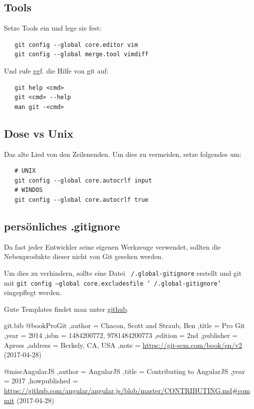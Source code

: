 \documentclass[
   draft=false
  ,paper=a4
  ,twoside=false
  ,fontsize=11pt
  ,headsepline
  ,DIV=11
  ,parskip=full+
  ,titlepage
]{scrartcl} %
\begin{document}
\subsection{Tools}

Setze Tools ein und lege sie fest:
\begin{lstlisting}
   git config --global core.editor vim
   git config --global merge.tool vimdiff   
\end{lstlisting}

Und rufe ggf. die Hilfe von git auf:
\begin{lstlisting}
   git help <cmd>
   git <cmd> --help
   man git -<cmd>
\end{lstlisting}


\subsection{Dose vs Unix}
Das alte Lied von den Zeilenenden. Um dies zu vermeiden, setze folgendes um:
\begin{lstlisting}
   # UNIX
   git config --global core.autocrlf input    
   # WINDOS
   git config --global core.autocrlf true
\end{lstlisting}

\subsection{persönliches .gitignore}
Da fast jeder Entwickler seine eigenen Werkzeuge verwendet, sollten die 
Nebenprodukte dieser nicht von Git gesehen werden.

Um dies zu verhindern, sollte eine Datei \texttt{~/.global-gitignore}
erstellt und git mit 
\newline 
\texttt{git config --global core.excludesfile '~/.global-gitignore'}
\newline
eingepflegt werden.

Gute Templates findet man unter 
\href{https://github.com/github/gitignore/tree/master/Global}{github}.

\begin{filecontents}{git.bib}
@book{ProGit
  ,author    = {Chacon, Scott and Straub, Ben}
  ,title     = {Pro Git}
  ,year      = {2014}
  ,isbn      = {1484200772, 9781484200773}
  ,edition   = {2nd}
  ,publisher = {Apress}
  ,address   = {Berkely, CA, USA}
  ,note      = {\url{https://git-scm.com/book/en/v2} (2017-04-28)}
}

@misc{AngularJS
  ,author = {AngularJS}
  ,title  = {Contributing to {A}ngular{JS}}
  ,year   = {2017}
  ,howpublished = {\url{https://github.com/angular/angular.js/blob/master/CONTRIBUTING.md#commit} (2017-04-28)}
}
\end{filecontents}
	
	


\end{document}
